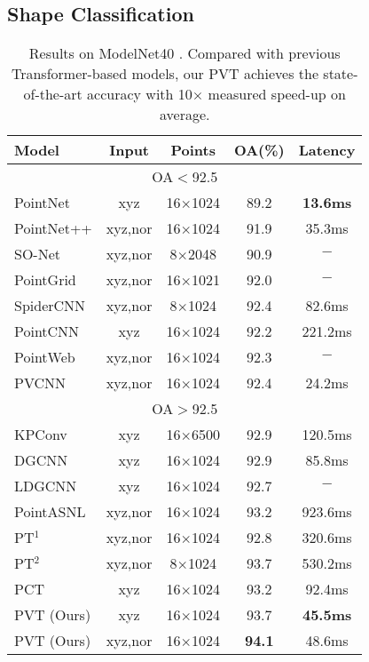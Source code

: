 \documentclass[10pt,twocolumn,letterpaper]{article}
\begin{document}
\subsection{Shape Classification}
\begin{table}  
\centering
\begin{center} 
\begin{tabular}{|l|cccc|}   
\hline  
Model & Input & Points & OA(\%) & Latency\\ 
\hline
\multicolumn{5}{|c|}{OA$<$92.5} \\
\hline
PointNet  & xyz & 16$\times$1024 &  89.2  & \textbf{13.6ms}\\ 
PointNet++  \cite{qi2017pointnet++} & xyz,nor & 16$\times$1024 &  91.9  & 35.3ms\\  
SO-Net \cite{2018SO}  & xyz,nor & 8$\times$2048 & 90.9   & $-$\\
PointGrid \cite{2018PointGrid}  & xyz,nor & 16$\times$1021 & 92.0   & $-$\\
SpiderCNN \cite{2018SpiderCNN}  & xyz,nor & 8$\times$1024 & 92.4   &82.6ms \\
PointCNN \cite{2018PointCNN} & xyz & 16$\times$1024 & 92.2  & 221.2ms\\  
PointWeb \cite{zhao2019pointweb}  & xyz,nor & 16$\times$1024 & 92.3  & $-$\\  
PVCNN \cite{2019Point} & xyz,nor & 16$\times$1024  & 92.4 & 24.2ms\\
\hline
\multicolumn{5}{|c|}{OA$>$92.5} \\
\hline
KPConv \cite{2019KPConv}  & xyz &16$\times$6500 & 92.9   &120.5ms \\ 
DGCNN \cite{2018Dynamic}  & xyz & 16$\times$1024 & 92.9  &  85.8ms\\
LDGCNN \cite{2019Linked}  & xyz & 16$\times$1024 & 92.7  &$-$ \\
PointASNL \cite{2020PointASNL} & xyz,nor & 16$\times$1024 & 93.2  & 923.6ms\\
PT$^1$ \cite{Nico}& xyz,nor & 16$\times$1024 & 92.8 & 320.6ms\\
PT$^2$ \cite{zhao2020point} & xyz,nor  & 8$\times$1024 & 93.7  & 530.2ms \\
PCT \cite{guo2020pct}  & xyz  & 16$\times$1024 & 93.2 & 92.4ms\\
PVT (Ours) & xyz & 16$\times$1024  & 93.7 & \textbf{45.5ms}\\
PVT (Ours) & xyz,nor & 16$\times$1024  & \textbf{94.1} & 48.6ms\\
\hline

\end{tabular}  
\end{center}  
\caption{Results on ModelNet40 \cite{20153D}. Compared with previous Transformer-based models, our PVT achieves the state-of-the-art accuracy with 10$\times$ measured speed-up on average.} 
\label{cla}
\end{table} 
\end{document}
